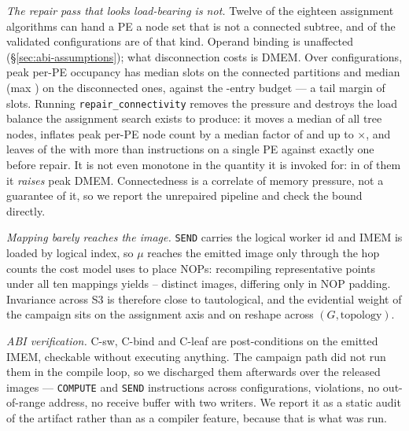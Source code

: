 \documentclass[journal,10pt]{IEEEtran}
\theoremstyle{plain}
\theoremstyle{definition}
\theoremstyle{remark}
\newcommand{\sv}[1]{\texttt{#1}}
\newcommand{\map}{\ensuremath{\mu}}
\begin{document}
\emph{The repair pass that looks load-bearing is not.} Twelve of the eighteen
assignment algorithms can hand a PE a node set that is not a connected
subtree, and \DisconnCount{} of the \WallTBs{} validated configurations are of
that kind. Operand binding is unaffected (\S\ref{sec:abi-assumptions}); what
disconnection costs is DMEM. Over \BindConfigs{} configurations, peak per-PE
occupancy has median \DmemMedConn{} slots on the \DmemConnConfigs{} connected
partitions and median \DmemMedDisc{} (max \DmemPeakMax) on the
\DmemDiscConfigs{} disconnected ones, against the \DmemDepth-entry budget --- a
tail margin of \DmemMargin{} slots. Running \sv{repair\_connectivity} removes
the pressure and destroys the load balance the assignment search exists to
produce: it moves a median \RepairMovedMed{} of all tree nodes, inflates peak
per-PE node count by a median factor of \RepairLoadMed{} and up to
\RepairLoadMax$\times$, and leaves \RepairImemOver{} of the
\DmemDiscConfigs{} with more than \DmemDepth{} instructions on a single PE
against exactly one before repair. It is not even monotone in the quantity it
is invoked for: in \RepairDmemUp{} of them it \emph{raises} peak DMEM.
Connectedness is a correlate of memory pressure, not a guarantee of it, so we
report the unrepaired pipeline and check the bound directly.

\emph{Mapping barely reaches the image.} \texttt{SEND} carries the logical
worker id and IMEM is loaded by logical index, so $\map$ reaches the emitted
image only through the hop counts the cost model uses to place NOPs:
recompiling \MapPoints{} representative points under all ten mappings yields
\MapImagesLo{}--\MapImagesHi{} distinct images, differing only in NOP padding.
Invariance across S3 is therefore close to tautological, and the evidential
weight of the campaign sits on the assignment axis and on reshape across
$(G,\text{topology})$.

\emph{ABI verification.} \textsf{C-sw}, \textsf{C-bind} and \textsf{C-leaf}
are post-conditions on the emitted IMEM, checkable without executing anything.
The campaign path did not run them in the compile loop, so we discharged them
afterwards over the released images --- \BindComputes{} \texttt{COMPUTE} and
\BindSends{} \texttt{SEND} instructions across \BindConfigs{} configurations,
\BindViolations{} violations, no out-of-range address, no receive buffer with
two writers. We report it as a static audit of the artifact rather than as a
compiler feature, because that is what was run.


\end{document}
